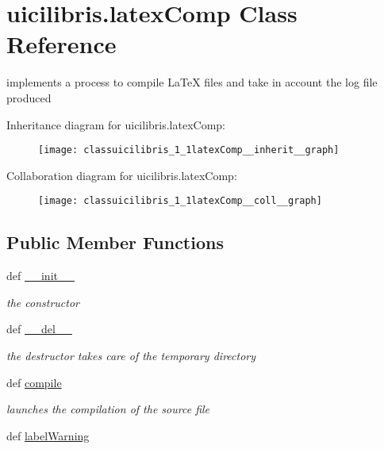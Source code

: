 \hypertarget{classuicilibris_1_1latexComp}{\section{uicilibris.\-latex\-Comp \-Class \-Reference}
\label{classuicilibris_1_1latexComp}
}


implements a process to compile \-La\-Te\-X files and take in account the log file produced  




\-Inheritance diagram for uicilibris.\-latex\-Comp\-:
\nopagebreak
\begin{figure}[H]
\begin{center}
\leavevmode
\texttt{[image: classuicilibris\_1\_1latexComp\_\_inherit\_\_graph]}
\end{center}
\end{figure}


\-Collaboration diagram for uicilibris.\-latex\-Comp\-:
\nopagebreak
\begin{figure}[H]
\begin{center}
\leavevmode
\texttt{[image: classuicilibris\_1\_1latexComp\_\_coll\_\_graph]}
\end{center}
\end{figure}
\subsection*{\-Public \-Member \-Functions}
\begin{DoxyCompactItemize}
\item 
def \hyperlink{classuicilibris_1_1latexComp_aaea2a8829e4df2daf4bad3e7aac6d03c}{\-\_\-\-\_\-init\-\_\-\-\_\-}
\begin{DoxyCompactList}\small\item\em the constructor \end{DoxyCompactList}\item 
def \hyperlink{classuicilibris_1_1latexComp_ae6165e417ac4520218f920db41a2d5a9}{\-\_\-\-\_\-del\-\_\-\-\_\-}
\begin{DoxyCompactList}\small\item\em the destructor takes care of the temporary directory \end{DoxyCompactList}\item 
def \hyperlink{classuicilibris_1_1latexComp_a398668b3ed295e02ea572a3963650de9}{compile}
\begin{DoxyCompactList}\small\item\em launches the compilation of the source file \end{DoxyCompactList}\item 
def \hyperlink{classuicilibris_1_1latexComp_a485cce2ece2e229a22aa21e4a2d28459}{label\-Warning}
\end{DoxyCompactItemize}
